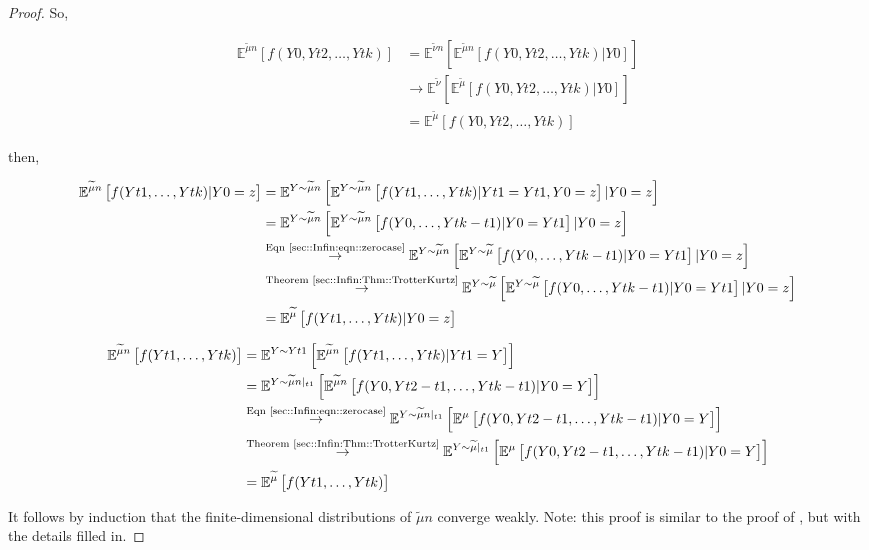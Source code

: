 \documentclass[12pt]{article}
\newcommand{\mb}{\mathbb}
\newcommand{\ra}{\rightarrow}
\newcommand{\os}{\overset}
\newcommand{\te}{\text}
\newcommand{\exmu}[2]{\mb{E}^{#1}\left[#2\right]}	%
\renewcommand{\t}{t}							%
\newcommand{\alt}[1]{\widetilde{#1}}			%
\newcommand{\m}{\mu}							%
\newcommand{\mm}{\nu}							%
\newcommand{\XX}{Y}								%
\renewcommand{\it}{k}							%
\newcommand{\xxx}{z}							%
\begin{document}
\begin{proof}
So,

\begin{align*}
\exmu{\alt{\m}{n}}{f(\XX{}{0},\XX{}{\t{2}},\dots,\XX{}{\t{\it}})} &= \exmu{\alt{\mm}{n}}{\exmu{\alt{\m}{n}}{f(\XX{}{0},\XX{}{\t{2}},\dots,\XX{}{\t{\it}})|\XX{}{0}}}\\
&\ra \exmu{\alt{\mm}}{\exmu{\alt{\m}}{f(\XX{}{0},\XX{}{\t{2}},\dots,\XX{}{\t{\it}})|\XX{}{0}}}\\
&= \exmu{\alt{\m}}{f(\XX{}{0},\XX{}{\t{2}},\dots,\XX{}{\t{\it}})}
\end{align*}

then,

\begin{align*}
\exmu{\alt{\m}{n}}{f(\XX{}{\t{1}},\dots,\XX{}{\t{\it}})|\XX{}{0}=\xxx}&=\exmu{\XX\sim\alt{\m}{n}}{\exmu{\XX\sim \alt{\m}{n}}{f(\XX{\t{1}},\dots,\XX{\t{\it}})|\XX{\t{1}}=\XX{}{\t{1}},\XX{0}=\xxx}|\XX{}{0}=\xxx}\\
&=\exmu{\XX\sim\alt{\m}{n}}{\exmu{\XX\sim \alt{\m}{n}}{f(\XX{0},\dots,\XX{\t{\it}-\t{1}})|\XX{0}=\XX{}{\t{1}}}|\XX{}{0}=\xxx}\\
&\os{\te{Eqn \eqref{sec::Infin:eqn::zerocase}}}{\ra} \exmu{\XX\sim\alt{\m}{n}}{\exmu{\XX\sim \alt{\m}}{f(\XX{0},\dots,\XX{\t{\it}-\t{1}})|\XX{0}=\XX{}{\t{1}}}|\XX{}{0}=\xxx}\\
&\os{\te{Theorem \ref{sec::Infin:Thm::TrotterKurtz}}}{\ra} \exmu{\XX\sim\alt{\m}}{\exmu{\XX\sim \alt{\m}}{f(\XX{0},\dots,\XX{\t{\it}-\t{1}})|\XX{0}=\XX{}{\t{1}}}|\XX{}{0}=\xxx}\\
&=\exmu{\alt{\m}}{f(\XX{}{\t{1}},\dots,\XX{}{\t{\it}})|\XX{}{0}=\xxx}
\end{align*}

\begin{align*}
\exmu{\alt{\m}{n}}{f(\XX{}{\t{1}},\dots,\XX{}{\t{\it}})}&= \exmu{\XX\sim \XX{}{\t{1}}}{\exmu{\alt{\m}{n}}{f(\XX{}{\t{1}},\dots,\XX{}{\t{\it}})|\XX{}{\t{1}}=\XX}}\\
&=\exmu{\XX\sim \alt{\m}{n}|_{\t{1}}}{\exmu{\alt{\m}{n}}{f(\XX{}{0},\XX{\t{2}-\t{1}},\dots,\XX{\t{\it}-\t{1}})|\XX{}{0}=\XX}}\\
&\os{\te{Eqn \eqref{sec::Infin:eqn::zerocase}}}{\ra} \exmu{\XX\sim \alt{\m}{n}|_{\t{1}}}{\exmu{\m}{f(\XX{}{0},\XX{\t{2}-\t{1}},\dots,\XX{\t{\it}-\t{1}})|\XX{}{0}=\XX}}\\
&\os{\te{Theorem \ref{sec::Infin:Thm::TrotterKurtz}}}{\ra} \exmu{\XX\sim \alt{\m}|_{\t{1}}}{\exmu{\m}{f(\XX{}{0},\XX{\t{2}-\t{1}},\dots,\XX{\t{\it}-\t{1}})|\XX{}{0}=\XX}}\\
&=\exmu{\alt{\m}}{f(\XX{}{\t{1}},\dots,\XX{}{\t{\it}})}
\end{align*}

It follows by induction that the finite-dimensional distributions of \(\alt{\m}{n}\) converge weakly. Note: this proof is similar to the proof of \cite[Theorem 4.2]{Kur81}, but with the details filled in.
\end{proof}
\end{document}
